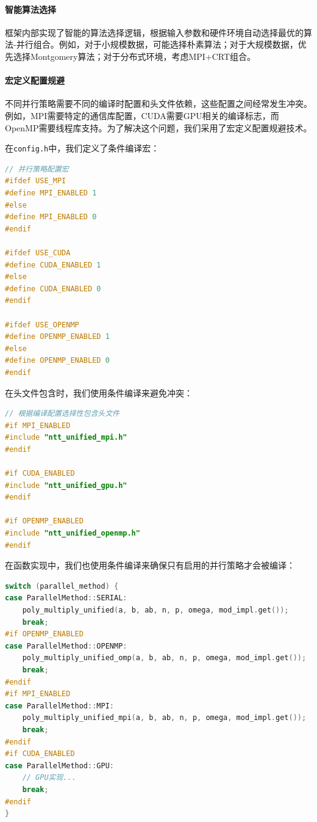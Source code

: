 \documentclass[a4paper]{article}
\begin{document}
\paragraph{智能算法选择} 框架内部实现了智能的算法选择逻辑，根据输入参数和硬件环境自动选择最优的算法-并行组合。例如，对于小规模数据，可能选择朴素算法；对于大规模数据，优先选择Montgomery算法；对于分布式环境，考虑MPI+CRT组合。

\paragraph{宏定义配置规避} 不同并行策略需要不同的编译时配置和头文件依赖，这些配置之间经常发生冲突。例如，MPI需要特定的通信库配置，CUDA需要GPU相关的编译标志，而OpenMP需要线程库支持。为了解决这个问题，我们采用了宏定义配置规避技术。

在\texttt{config.h}中，我们定义了条件编译宏：

\begin{lstlisting}[language=C++]
// 并行策略配置宏
#ifdef USE_MPI
#define MPI_ENABLED 1
#else
#define MPI_ENABLED 0
#endif

#ifdef USE_CUDA
#define CUDA_ENABLED 1
#else
#define CUDA_ENABLED 0
#endif

#ifdef USE_OPENMP
#define OPENMP_ENABLED 1
#else
#define OPENMP_ENABLED 0
#endif
\end{lstlisting}

在头文件包含时，我们使用条件编译来避免冲突：

\begin{lstlisting}[language=C++]
// 根据编译配置选择性包含头文件
#if MPI_ENABLED
#include "ntt_unified_mpi.h"
#endif

#if CUDA_ENABLED
#include "ntt_unified_gpu.h"
#endif

#if OPENMP_ENABLED
#include "ntt_unified_openmp.h"
#endif
\end{lstlisting}

在函数实现中，我们也使用条件编译来确保只有启用的并行策略才会被编译：

\begin{lstlisting}[language=C++]
switch (parallel_method) {
case ParallelMethod::SERIAL:
    poly_multiply_unified(a, b, ab, n, p, omega, mod_impl.get());
    break;
#if OPENMP_ENABLED
case ParallelMethod::OPENMP:
    poly_multiply_unified_omp(a, b, ab, n, p, omega, mod_impl.get());
    break;
#endif
#if MPI_ENABLED
case ParallelMethod::MPI:
    poly_multiply_unified_mpi(a, b, ab, n, p, omega, mod_impl.get());
    break;
#endif
#if CUDA_ENABLED
case ParallelMethod::GPU:
    // GPU实现...
    break;
#endif
}
\end{lstlisting}
\end{document}
